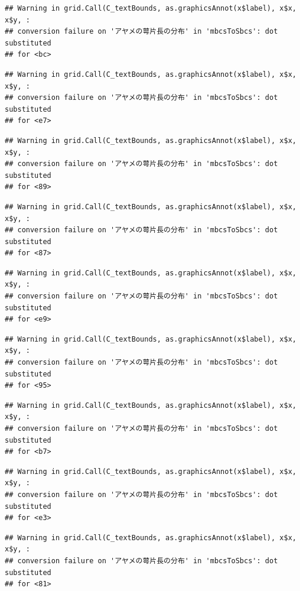 \documentclass[
]{book}
\begin{document}
\begin{verbatim}
## Warning in grid.Call(C_textBounds, as.graphicsAnnot(x$label), x$x, x$y, :
## conversion failure on 'アヤメの萼片長の分布' in 'mbcsToSbcs': dot substituted
## for <bc>
\end{verbatim}

\begin{verbatim}
## Warning in grid.Call(C_textBounds, as.graphicsAnnot(x$label), x$x, x$y, :
## conversion failure on 'アヤメの萼片長の分布' in 'mbcsToSbcs': dot substituted
## for <e7>
\end{verbatim}

\begin{verbatim}
## Warning in grid.Call(C_textBounds, as.graphicsAnnot(x$label), x$x, x$y, :
## conversion failure on 'アヤメの萼片長の分布' in 'mbcsToSbcs': dot substituted
## for <89>
\end{verbatim}

\begin{verbatim}
## Warning in grid.Call(C_textBounds, as.graphicsAnnot(x$label), x$x, x$y, :
## conversion failure on 'アヤメの萼片長の分布' in 'mbcsToSbcs': dot substituted
## for <87>
\end{verbatim}

\begin{verbatim}
## Warning in grid.Call(C_textBounds, as.graphicsAnnot(x$label), x$x, x$y, :
## conversion failure on 'アヤメの萼片長の分布' in 'mbcsToSbcs': dot substituted
## for <e9>
\end{verbatim}

\begin{verbatim}
## Warning in grid.Call(C_textBounds, as.graphicsAnnot(x$label), x$x, x$y, :
## conversion failure on 'アヤメの萼片長の分布' in 'mbcsToSbcs': dot substituted
## for <95>
\end{verbatim}

\begin{verbatim}
## Warning in grid.Call(C_textBounds, as.graphicsAnnot(x$label), x$x, x$y, :
## conversion failure on 'アヤメの萼片長の分布' in 'mbcsToSbcs': dot substituted
## for <b7>
\end{verbatim}

\begin{verbatim}
## Warning in grid.Call(C_textBounds, as.graphicsAnnot(x$label), x$x, x$y, :
## conversion failure on 'アヤメの萼片長の分布' in 'mbcsToSbcs': dot substituted
## for <e3>
\end{verbatim}

\begin{verbatim}
## Warning in grid.Call(C_textBounds, as.graphicsAnnot(x$label), x$x, x$y, :
## conversion failure on 'アヤメの萼片長の分布' in 'mbcsToSbcs': dot substituted
## for <81>
\end{verbatim}
\end{document}
